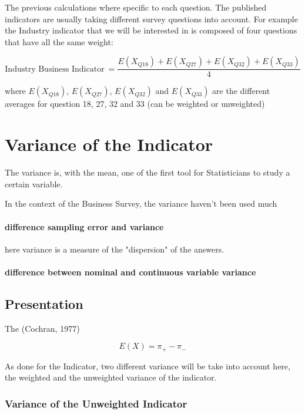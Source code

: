 \documentclass[12pt,a4paper,oneside]{book}
\begin{document}
The previous calculations where specific to each question. The published indicators are usually taking different survey questions into account. For example the Industry indicator that we will be interested in is composed of four questions that have all the same weight:

\begin{equation}
    \mbox{Industry Business Indicator}\ = \frac{E(X_{Q18}) + E(X_{Q27}) + E(X_{Q32}) + E(X_{Q33})}{4}
\end{equation}

where 
$E(X_{Q18})$, $E(X_{Q27})$, $E(X_{Q32})$ and $E(X_{Q33})$ are the different averages for question 18, 27, 32 and 33 (can be weighted or unweighted)


\chapter{Variance of the Indicator}

The variance is, with the mean, one of the first tool for Statisticians to study a certain variable.

In the context of the Business Survey, the variance haven't been used much

\subsubsection{difference sampling error and variance}

here variance is a measure of the "dispersion" of the answers.

\subsubsection{difference between nominal and continuous variable variance}

\section{Presentation}

The (Cochran, 1977) 


\begin{equation}
    E(X) = \pi_+ - \pi_-
\end{equation}
 
As done for the Indicator, two different variance will be take into account here, the weighted and the unweighted variance of the indicator.


\subsection{Variance of the Unweighted Indicator}
\end{document}
